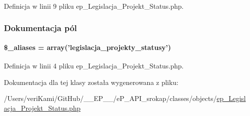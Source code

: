 Definicja w linii 9 pliku ep\-\_\-\-Legislacja\-\_\-\-Projekt\-\_\-\-Status.\-php.



\subsubsection{Dokumentacja pól}
\hypertarget{classep___legislacja___projekt___status_ab4e31d75f0bc5d512456911e5d01366b}{
\paragraph[{\$\-\_\-aliases}]{\setlength{\rightskip}{0pt plus 5cm}\$\-\_\-aliases = array('legislacja\-\_\-projekty\-\_\-statusy')}}\label{classep___legislacja___projekt___status_ab4e31d75f0bc5d512456911e5d01366b}


Definicja w linii 4 pliku ep\-\_\-\-Legislacja\-\_\-\-Projekt\-\_\-\-Status.\-php.



Dokumentacja dla tej klasy została wygenerowana z pliku\-:\begin{DoxyCompactItemize}
\item 
/\-Users/veri\-Kami/\-Git\-Hub/\-\_\-\-\_\-\-E\-P\-\_\-\-\_\-/e\-P\-\_\-\-A\-P\-I\-\_\-srokap/classes/objects/\hyperlink{ep___legislacja___projekt___status_8php}{ep\-\_\-\-Legislacja\-\_\-\-Projekt\-\_\-\-Status.\-php}\end{DoxyCompactItemize}
